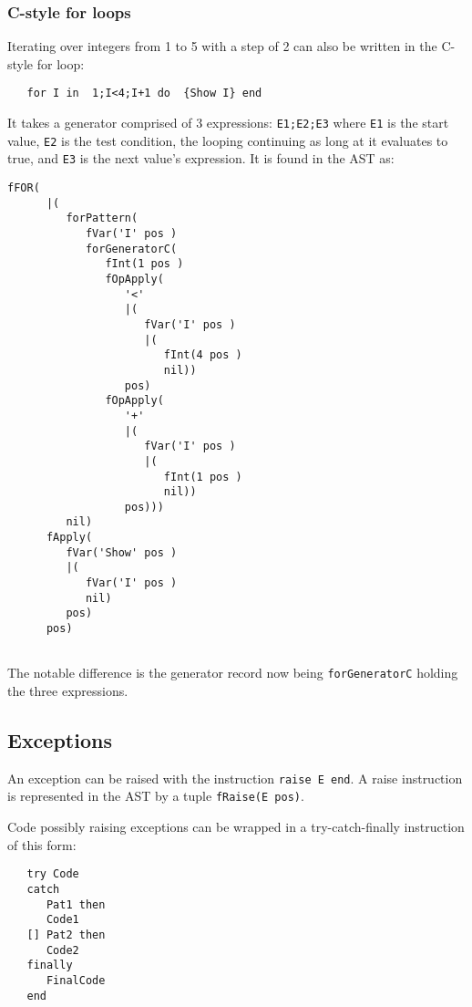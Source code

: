 \documentclass[a4paper]{memoir}
\begin{document}
\subsubsection{C-style for loops}
Iterating over integers from 1 to 5 with a step of 2 can also be written in the C-style for loop:
\begin{lstlisting}
   for I in  1;I<4;I+1 do  {Show I} end
\end{lstlisting}
It takes a generator comprised of 3 expressions: \lstinline!E1;E2;E3! where
\lstinline!E1! is the start value, \lstinline!E2! is the test condition, the
looping continuing as long at it evaluates to true, and \lstinline!E3! is the
next value's expression.
It is found in the AST as:
\begin{lstlisting}
fFOR(
      |(
         forPattern(
            fVar('I' pos )
            forGeneratorC(
               fInt(1 pos )
               fOpApply(
                  '<'
                  |(
                     fVar('I' pos )
                     |(
                        fInt(4 pos )
                        nil))
                  pos)
               fOpApply(
                  '+'
                  |(
                     fVar('I' pos )
                     |(
                        fInt(1 pos )
                        nil))
                  pos)))
         nil)
      fApply(
         fVar('Show' pos )
         |(
            fVar('I' pos )
            nil)
         pos)
      pos)
  
\end{lstlisting}

The notable difference is the generator record now being
\lstinline!forGeneratorC! holding the three expressions.

\subsection{Exceptions}\label{sec:input:exceptions}
An exception can be raised with the instruction \lstinline!raise E end!.
A raise instruction is represented in the AST by a tuple \lstinline!fRaise(E pos)!.

Code possibly raising exceptions can be wrapped in a try-catch-finally
instruction of this form:
\begin{lstlisting}
   try Code
   catch
      Pat1 then
      Code1
   [] Pat2 then
      Code2
   finally
      FinalCode
   end
\end{lstlisting}
\end{document}
